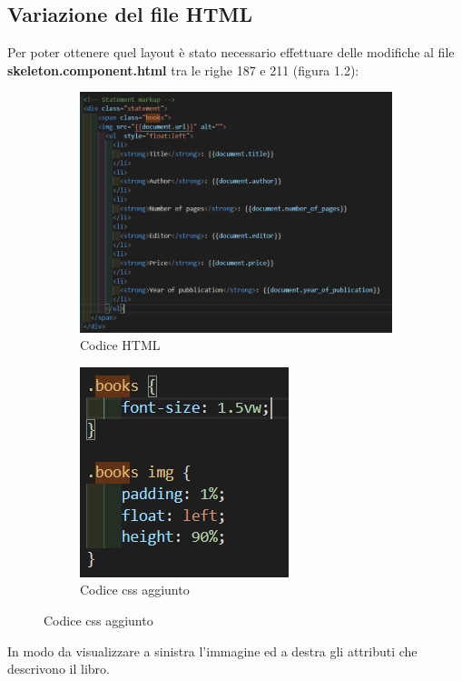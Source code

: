 \documentclass[a4paper,11pt]{report}
\begin{document}
\subsection{Variazione del file HTML}
Per poter ottenere quel layout è stato necessario effettuare delle modifiche al file \textbf{skeleton.component.html} tra le righe 187 e 211 (figura 1.2):
\begin{figure}[H]
	\begin{subfigure}{.65\textwidth}
		\centering
		\includegraphics[width=1\linewidth]{statement}
		\caption{Codice HTML}
		\label{fig:statement}
	\end{subfigure}%
	\begin{subfigure}{.25\textwidth}
		\centering
		\includegraphics[width=.9\linewidth]{css}
		\caption{Codice css aggiunto}
		\label{fig:css}
	\end{subfigure}%
	
\end{figure}
In modo da visualizzare a sinistra l'immagine ed a destra gli attributi che descrivono il libro.
\end{document}

